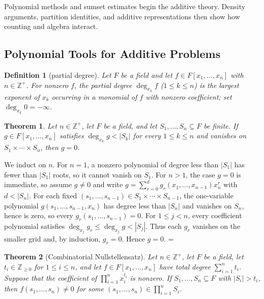 \documentclass[11pt]{article}
\makeatletter
\let\nt@closedisplay\]
\def\nt@guardedclose{\@ifnextchar\par{\nt@closeafterpar}{\@ifnextchar\end{\postdisplaypenalty\@M\nt@closedisplay}{\nt@closedisplay}}}
\def\nt@closeafterpar\par{\@ifnextchar\par{\nt@closeafterpar}{\@ifnextchar\end{\postdisplaypenalty\@M\nt@closedisplay\par}{\nt@closedisplay\par}}}
\renewenvironment{proof}[1][\proofname]{\par
  \pushQED{\qed}\normalfont\topsep\medskipamount\edef\nt@afterproof{\@endparpenalty=\the\@endparpenalty\relax}\@beginparpenalty\@M\@endparpenalty\@M\let\]\nt@guardedclose\trivlist\item[]\textit{#1\@addpunct{.}} \ignorespaces}{\ifvmode\addpenalty\@M\fi\popQED\nt@afterproof\endtrivlist\@endpefalse}
\theoremstyle{ntstyle}
\newtheorem{theorem}{Theorem}[subsection]
\newtheorem{definition}{Definition}[subsection]
\makeatother
\begin{document}
Polynomial methods and sumset estimates begin the additive theory. Density arguments, partition identities, and
additive representations then show how counting and algebra interact.


\subsection{Polynomial Tools for Additive Problems}

\begin{definition}[partial degree]\label{def:12.1.1}\label{def:partial-degree}
  Let $F$ be a field and let
  $f\in F[x_1,\ldots,x_n]$ with $n\in\mathbb{Z}^+$. For nonzero $f$, the
  partial degree $\deg_{x_k}f$ ($1\le k\le n$) is the largest exponent of
  $x_k$ occurring in a monomial of $f$ with nonzero coefficient; set
  $\deg_{x_k}0=-\infty$.

\end{definition}

\begin{theorem}\label{thm:12.1.1} Let $n\in\mathbb{Z}^+$, let $F$ be a
  field, and let $S_1,\ldots,S_n\subseteq F$ be finite. If
  $g\in F[x_1,\ldots,x_n]$ satisfies $\deg_{x_k}g<|S_k|$ for every
  $1\le k\le n$ and vanishes on $S_1\times\cdots\times S_n$, then $g=0$.

\end{theorem}

\begin{proof} We induct on $n$. For $n=1$, a nonzero
  polynomial of degree less than $|S_1|$ has fewer than $|S_1|$ roots, so it cannot
  vanish on $S_1$. For $n>1$, the case $g=0$ is immediate, so assume
  $g\neq0$ and write
  $g=\sum_{r=0}^{d}g_r(x_1,\ldots,x_{n-1})x_n^{r}$ with $d<|S_n|$. For
  each fixed $(s_1,\ldots,s_{n-1})\in S_1\times\cdots\times S_{n-1}$,
  the one-variable polynomial $g(s_1,\ldots,s_{n-1},x_n)$ has degree less than $|S_n|$ and
  vanishes on $S_n$, hence is zero, so every
  $g_r(s_1,\ldots,s_{n-1})=0$. For $1\le j<n$, every coefficient
  polynomial satisfies $\deg_{x_j}g_r\le\deg_{x_j}g<|S_j|$. Thus each
  $g_r$ vanishes on the smaller grid and, by induction, $g_r=0$. Hence
  $g=0$.
\end{proof}

\begin{theorem}[Combinatorial Nullstellensatz]\label{thm:12.1.2}\label{thm:combinatorial-nullstellensatz}
  Let
  $n\in\mathbb{Z}^+$, let $F$ be a field, let
  $t_i\in\mathbb{Z}_{\ge0}$ for $1\le i\le n$, and let
  $f\in F[x_1,\ldots,x_n]$ have total degree
  $\sum_{i=1}^n t_i$. Suppose that the coefficient of $\prod_{i=1}^{n}x_i^{t_i}$
  is nonzero. If $S_1,\ldots,S_n\subseteq F$ with $|S_i| > t_i$, then
  $f(s_1,\ldots,s_n)\neq0$ for some
  $(s_1,\ldots,s_n)\in\prod_{i=1}^{n}S_i$.

\end{theorem}
\end{document}
